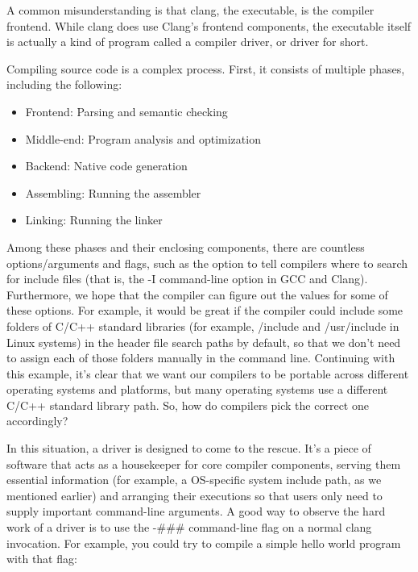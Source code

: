 
A common misunderstanding is that clang, the executable, is the compiler frontend. While clang does use Clang's frontend components, the executable itself is actually a kind of program called a compiler driver, or driver for short.

Compiling source code is a complex process. First, it consists of multiple phases, including the following:

\begin{itemize}
\item Frontend: Parsing and semantic checking
\item Middle-end: Program analysis and optimization
\item Backend: Native code generation
\item Assembling: Running the assembler
\item Linking: Running the linker
\end{itemize}

Among these phases and their enclosing components, there are countless options/arguments and flags, such as the option to tell compilers where to search for include files (that is, the -I command-line option in GCC and Clang). Furthermore, we hope that the compiler can figure out the values for some of these options. For example, it would be great if the compiler could include some folders of C/C++ standard libraries (for example, /include and /usr/include in Linux systems) in the header file search paths by default, so that we don't need to assign each of those folders manually in the command line. Continuing with this example, it's clear that we want our compilers to be portable across different operating systems and platforms, but many operating systems use a different C/C++ standard library path. So, how do compilers pick the correct one accordingly?

In this situation, a driver is designed to come to the rescue. It's a piece of software that acts as a housekeeper for core compiler components, serving them essential information (for example, a OS-specific system include path, as we mentioned earlier) and arranging their executions so that users only need to supply important command-line arguments. A good way to observe the hard work of a driver is to use the -\#\#\# command-line flag on a normal clang invocation. For example, you could try to compile a simple hello world program with that flag:

